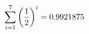 \documentclass[preview]{standalone}
\begin{document}
\begin{align*}
\sum_{i=1}^{ 7 } \left({ 1 } \over {2} \right)^i = { 0.9921875 }
\end{align*}
\end{document}
